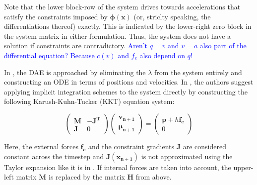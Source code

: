 \documentclass{article}
\begin{document}
Note that the lower block-row of the system drives towards accelerations that satisfy the constraints imposed by $\bm{\phi(x)}$ (or, striclty 
speaking, the differentiations thereof) exactly. This is indicated by the lower-right zero block in the system matrix in either formulation. 
Thus, the system does not have a solution if constraints are contradictory. \textcolor{blue}{Aren't $\dot{q} = v$ and $\dot{v} = a$ 
also part of the differential equation? Because $c(v)$ and $f_e$ also depend on $q$!}

In \cite{ascher1995}, the DAE is approached by eliminating the $\lambda$ from the system entirely and constructing an ODE in terms of positions
and velocities. In \cite{tournier2015}, the authors suggest applying implicit integration schemes to the system directly by constructing the 
following Karush-Kuhn-Tucker (KKT) equation system:

\[
\begin{pmatrix}
    \bm{M} & \bm{-J^T} \\
    \bm{J} & 0
\end{pmatrix}
\begin{pmatrix}
    \bm{v_{n+1}} \\
    \bm{\mu_{n+1}}
\end{pmatrix}
=
\begin{pmatrix}
    \bm{p} + h\bm{f_e} \\
    0
\end{pmatrix}
\]

Here, the external forces $\bm{f_e}$ and the constraint gradients $\bm{J}$ are considered constant across the timestep and $\bm{J(x_{n+1})}$ 
is not approximated using the Taylor expansion like it is in \cite{baraff1998}. If internal forces are taken into account, the upper-left 
matrix $\bm{M}$ is replaced by the matrix $\bm{H}$ from above.
\end{document}
